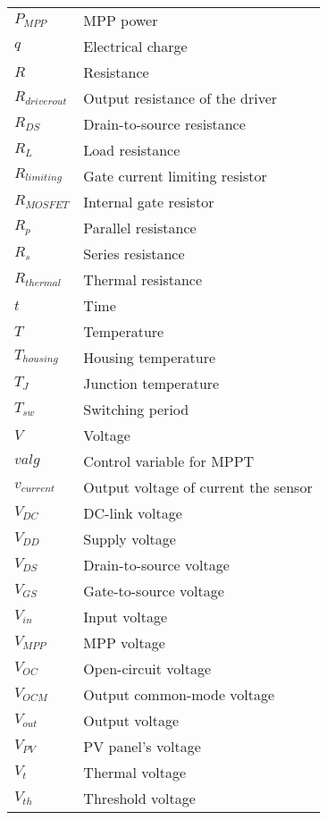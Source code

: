 \begin{tabular}{ll}
$P_{MPP}$ & MPP power \\
$q$ & Electrical charge \\
$R$ & Resistance\\
$R_{driver out}$ & Output resistance of the driver\\
$R_{DS}$ & Drain-to-source resistance\\
$R_{L}$ & Load resistance\\
$R_{limiting}$ & Gate current limiting resistor\\ 
$R_{MOSFET}$ & Internal gate resistor\\
$R_{p}$ & Parallel resistance \\
$R_{s}$ & Series resistance \\
$R_{thermal}$ & Thermal resistance\\
$t$ & Time\\
$T$ & Temperature \\
$T_{housing}$ & Housing temperature \\
$T_{J}$ & Junction temperature \\
$T_{sw}$ & Switching period \\
$V$ & Voltage\\
$valg$ & Control variable for MPPT \\
$v_{current}$ & Output voltage of current the sensor \\
$V_{DC}$ & DC-link voltage \\
$V_{DD}$ & Supply voltage\\
$V_{DS}$ & Drain-to-source voltage\\
$V_{GS}$ & Gate-to-source voltage\\
$V_{in}$ & Input voltage \\
$V_{MPP}$ & MPP voltage\\
$V_{OC}$ & Open-circuit voltage\\
$V_{OCM}$ & Output common-mode voltage \\
$V_{out}$ & Output voltage \\
$V_{PV}$ & PV panel's voltage \\
$V_{t}$ & Thermal voltage \\
$V_{th}$ & Threshold voltage \\
\end{tabular}
